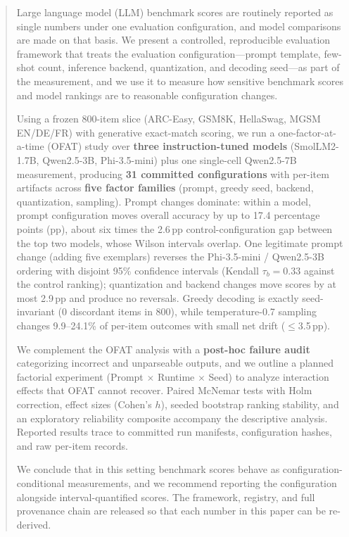 \begin{abstract}
Large language model (LLM) benchmark scores are routinely reported as single
numbers under one evaluation configuration, and model comparisons are made
on that basis. We present a controlled, reproducible evaluation framework
that treats the evaluation configuration---prompt template, few-shot count,
inference backend, quantization, and decoding seed---as part of the
measurement, and we use it to measure how sensitive benchmark scores and
model rankings are to reasonable configuration changes. 

Using a frozen 800-item slice (ARC-Easy, GSM8K, HellaSwag, MGSM EN/DE/FR) with generative
exact-match scoring, we run a one-factor-at-a-time (OFAT) study over \textbf{three instruction-tuned models} (SmolLM2-1.7B, Qwen2.5-3B, Phi-3.5-mini) plus one single-cell Qwen2.5-7B measurement, producing \textbf{31 committed configurations} with per-item artifacts across \textbf{five factor families} (prompt, greedy seed, backend, quantization, sampling). Prompt changes dominate: within a model, prompt configuration moves overall accuracy by up to 17.4 percentage points (pp), about six times the 2.6\,pp control-configuration gap between the top two models, whose Wilson intervals overlap. One legitimate prompt change (adding five exemplars) reverses the Phi-3.5-mini / Qwen2.5-3B ordering with disjoint 95\% confidence intervals (Kendall $\tau_b=0.33$ against the control ranking); quantization and backend changes move scores by at most 2.9\,pp and produce no reversals. Greedy decoding is exactly seed-invariant (0 discordant items in 800), while temperature-0.7 sampling changes 9.9--24.1\% of per-item outcomes with small net drift ($\leq$3.5\,pp). 

We complement the OFAT analysis with a \textbf{post-hoc failure audit} categorizing incorrect and unparseable outputs, and we outline a planned factorial experiment (Prompt $\times$ Runtime $\times$ Seed) to analyze interaction effects that OFAT cannot recover. Paired McNemar tests with Holm correction, effect sizes (Cohen's $h$), seeded bootstrap ranking stability, and an exploratory reliability composite accompany the descriptive analysis. Reported results trace to committed run manifests, configuration hashes, and raw per-item records.

We conclude that in this setting benchmark scores behave as configuration-conditional measurements, and we recommend reporting the configuration alongside interval-quantified scores. The framework, registry, and full provenance chain are released so that each number in this paper can be re-derived.
\end{abstract}
